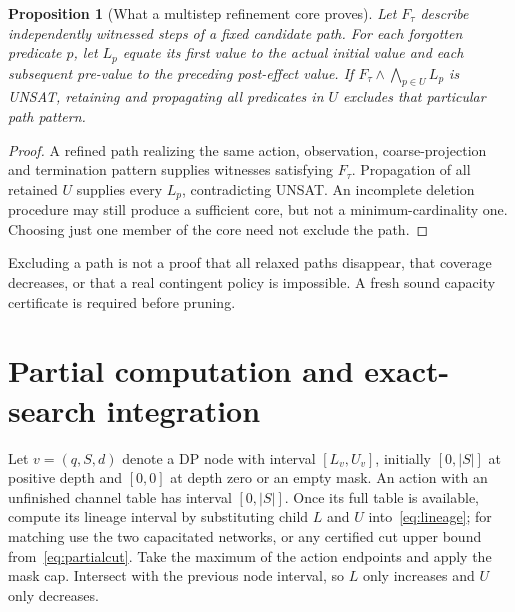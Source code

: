 \documentclass[11pt]{article}
\newtheorem{proposition}[theorem]{Proposition}
\theoremstyle{definition}
\newcommand{\card}[1]{\lvert #1\rvert}
\begin{document}
\begin{proposition}[What a multistep refinement core proves]
Let $F_\tau$ describe independently witnessed steps of a fixed candidate path.
For each forgotten predicate $p$, let $L_p$ equate its first value to the actual
initial value and each subsequent pre-value to the preceding post-effect value.
If $F_\tau\land\bigwedge_{p\in U}L_p$ is UNSAT, retaining and propagating
\emph{all} predicates in $U$ excludes that particular path pattern.
\end{proposition}
\begin{proof}
A refined path realizing the same action, observation, coarse-projection and
termination pattern supplies witnesses satisfying $F_\tau$. Propagation of all
retained $U$ supplies every $L_p$, contradicting UNSAT. An incomplete deletion
procedure may still produce a sufficient core, but not a minimum-cardinality
one. Choosing just one member of the core need not exclude the path.
\end{proof}
Excluding a path is not a proof that all relaxed paths disappear, that coverage
decreases, or that a real contingent policy is impossible. A fresh sound
capacity certificate is required before pruning.

\section{Partial computation and exact-search integration}
Let $v=(q,S,d)$ denote a DP node with interval $[L_v,U_v]$, initially
$[0,\card S]$ at positive depth and $[0,0]$ at depth zero or an empty mask.
An action with an unfinished channel table has interval $[0,\card S]$.
Once its full table is available, compute its lineage interval by substituting
child $L$ and $U$ into~\eqref{eq:lineage}; for matching use the two capacitated
networks, or any certified cut upper bound from~\eqref{eq:partialcut}.
Take the maximum of the action endpoints and apply the mask cap. Intersect
with the previous node interval, so $L$ only increases and $U$ only decreases.
\end{document}
